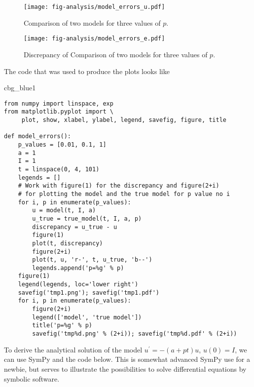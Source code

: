 \documentclass[graybox,sectrefs,envcountresetchap,open=right,final]{svmonodo}
\newenvironment{_cod_tight}[1]{
   \def\FrameCommand{\colorbox{#1}}
   \FrameRule0.6pt\MakeFramed {\FrameRestore}\vskip3mm}
   {\vskip0mm\endMakeFramed}
\newenvironment{cod}[1]{
\bgroup\rmfamily
\fboxsep=0mm\relax
\begin{_cod_tight}{#1}
\list{}{\parsep=-2mm\parskip=0mm\topsep=0pt\leftmargin=2mm
\rightmargin=2\leftmargin\leftmargin=4pt\relax}
\item\relax}
{\endlist\end{_cod_tight}\egroup}
\begin{document}
\begin{figure}[!ht]  %
  \centerline{\texttt{[image: fig-analysis/model\_errors\_u.pdf]}}
  \caption{
  Comparison of two models for three values of $p$. \label{decay:analysis:model_errors:fig:model_u}
  }
\end{figure}



\begin{figure}[!ht]  %
  \centerline{\texttt{[image: fig-analysis/model\_errors\_e.pdf]}}
  \caption{
  Discrepancy of Comparison of two models for three values of $p$. \label{decay:analysis:model_errors:fig:model_e}
  }
\end{figure}


The code that was used to produce the plots looks like

\begin{cod}{cbg_blue1}\begin{Verbatim}[numbers=none,fontsize=\fontsize{9pt}{9pt},baselinestretch=0.95,xleftmargin=2mm]
from numpy import linspace, exp
from matplotlib.pyplot import \ 
     plot, show, xlabel, ylabel, legend, savefig, figure, title

def model_errors():
    p_values = [0.01, 0.1, 1]
    a = 1
    I = 1
    t = linspace(0, 4, 101)
    legends = []
    # Work with figure(1) for the discrepancy and figure(2+i)
    # for plotting the model and the true model for p value no i
    for i, p in enumerate(p_values):
        u = model(t, I, a)
        u_true = true_model(t, I, a, p)
        discrepancy = u_true - u
        figure(1)
        plot(t, discrepancy)
        figure(2+i)
        plot(t, u, 'r-', t, u_true, 'b--')
        legends.append('p=%g' % p)
    figure(1)
    legend(legends, loc='lower right')
    savefig('tmp1.png'); savefig('tmp1.pdf')
    for i, p in enumerate(p_values):
        figure(2+i)
        legend(['model', 'true model'])
        title('p=%g' % p)
        savefig('tmp%d.png' % (2+i)); savefig('tmp%d.pdf' % (2+i))
\end{Verbatim}
\end{cod}
\noindent

To derive the analytical solution of the model $u^{\prime}=-(a+pt)u$, $
u(0)=I$, we can use SymPy and the code below. This is somewhat advanced
SymPy use for a newbie, but serves to illustrate the possibilities to
solve differential equations by symbolic software.
\end{document}

